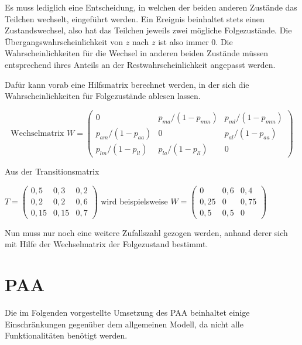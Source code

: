Es muss lediglich eine Entscheidung, in welchen der beiden anderen Zustände das Teilchen wechselt, eingeführt werden. Ein Ereignis beinhaltet stets einen Zustandswechsel, also hat das Teilchen jeweils zwei mögliche Folgezustände. Die Übergangswahrscheinlichkeit von $z$ nach $z$ ist also immer $0$. Die Wahrscheinlichkeiten für die Wechsel in anderen beiden Zustände müssen entsprechend ihres Anteils an der Restwahrscheinlichkeit angepasst werden.

Dafür kann vorab eine Hilfsmatrix berechnet werden, in der sich die Wahrscheinlichkeiten für Folgezustände ablesen lassen.

\begin{equation}
\text{Wechselmatrix } W = 
\begin{pmatrix}
0 &  p_{ma}/(1-p_{mm}) & p_{ml}/(1-p_{mm}) \\
p_{am}/(1- p_{aa}) & 0 & p_{al}/(1- p_{aa}) \\
p_{lm}/(1-p_{ll}) &  p_{la}/(1-p_{ll}) & 0 
\end{pmatrix}  
\end{equation}

Aus der Transitionsmatrix

$T= 
\begin{pmatrix}
0,5 & 0,3 & 0,2 \\
0,2 & 0,2 & 0,6 \\
0,15 & 0,15 & 0,7 
\end{pmatrix}
$  
wird beispielsweise  
$W= 
\begin{pmatrix}
0 & 0,6 & 0,4 \\
0,25 & 0 & 0,75 \\
0,5 & 0,5 & 0 
\end{pmatrix}
$  

Nun muss nur noch eine weitere Zufallszahl gezogen werden, anhand derer sich mit Hilfe der Wechselmatrix der Folgezustand bestimmt.


\section{PAA}

Die im Folgenden vorgestellte Umsetzung des PAA beinhaltet einige Einschränkungen gegenüber dem allgemeinen Modell, da nicht alle Funktionalitäten benötigt werden.

